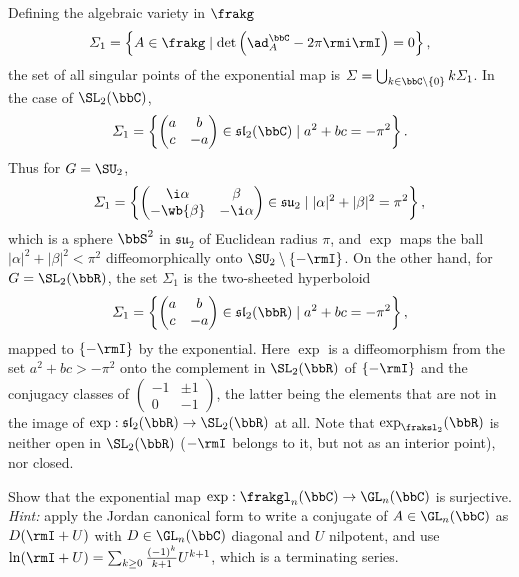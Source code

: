 \begin{example}
Defining the algebraic variety in $\frakg$
\[\varSigma_1=\left\{A\in\frakg\mid \det\left(\ad_A^\bbC -2\pi\rmi  \rmI\right)=0\right\},\]
the set of all singular points of the exponential map is $\varSigma=\bigcup_{k\in\bbC\setminus\{0\}} k\varSigma_1$. In the case of $\SL_2(\bbC)$,
\[\varSigma_1=\left\{\begin{pmatrix}
    a&b\\c&-a
\end{pmatrix}\in\mathfrak{sl}_2(\bbC)\mid a^2+bc=-\pi^2\right\}.\]
Thus for $G=\SU_2$,
\[\varSigma_1=\left\{\begin{pmatrix}
    \i\alpha&\beta\\-\wb{\beta}&-\i\alpha
\end{pmatrix}\in\mathfrak{su}_2\mid |\alpha|^2+|\beta|^2=\pi^2\right\},\]
which is a sphere $\bbS^2$ in $\mathfrak{su}_2$ of Euclidean radius $\pi$, and $\exp$ maps the ball $|\alpha|^2+|\beta|^2<\pi^2$ diffeomorphically onto $\SU_2\setminus\{-\rmI\}$. On the other hand, for $G=\SL_2(\bbR)$, the set $\varSigma_1$ is the two-sheeted hyperboloid
\[\varSigma_1=\left\{\begin{pmatrix}
    a&b\\c&-a
\end{pmatrix}\in\mathfrak{sl}_2(\bbR)\mid a^2+bc=-\pi^2\right\},\]
mapped to $\{-\rmI\}$ by the exponential. Here $\exp$ is a diffeomorphism from the set $a^2+bc>-\pi^2$ onto the complement in $\SL_2(\bbR)$ of $\{-\rmI\}$ and the conjugacy classes of $\left(\begin{smallmatrix}
    -1&\pm1\\0&-1
\end{smallmatrix}\right)$, the latter being the elements that are not in the image of $\exp:\mathfrak{sl}_2(\bbR)\to \SL_2(\bbR)$ at all. Note that $\exp_{\fraksl_2}(\bbR)$ is neither open in $\SL_2(\bbR)$ ($-\rmI$ belongs to it, but not as an interior point), nor closed.
\end{example}

\begin{xca}
    Show that the exponential map $\exp:\frakgl_n(\bbC)\to \GL_n(\bbC)$ is surjective. \emph{Hint:} apply the Jordan canonical form to write a conjugate of $A\in\GL_n(\bbC)$ as $D(\rmI+U)$ with $D\in\GL_n(\bbC)$ diagonal and $U$ nilpotent, and use $\ln(\rmI+U)=\sum_{k\geq 0} \frac{(-1)^k}{k+1}U^{k+1}$, which is a terminating series.
\end{xca}





